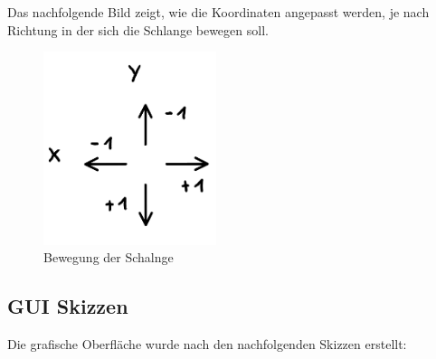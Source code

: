 \documentclass[a4paper,10pt]{article}
\begin{document}
			Das nachfolgende Bild zeigt, wie die Koordinaten angepasst werden, 
			je nach Richtung in der sich die Schlange bewegen soll.\\
			\begin{figure}[h]
				\centering
				\includegraphics[width=0.45\textwidth]{richtung}
				\caption{Bewegung der Schalnge}
				\label{move}
			\end{figure}
			\newpage
		\subsection{GUI Skizzen}
			Die grafische Oberfläche wurde nach den nachfolgenden Skizzen 
			erstellt:\\
		
\end{document}
